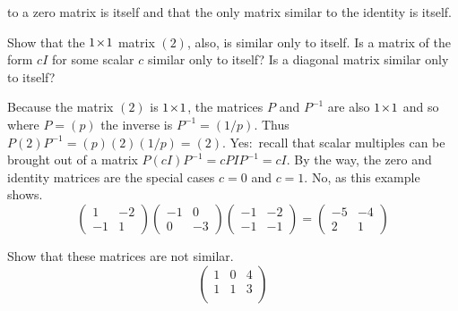 \begin{exercises}
    to a zero matrix is itself and that 
    the only matrix similar to the identity
    is itself.
    \begin{exparts}
      \partsitem Show that the $1 \! \times \! 1$ matrix $(2)$,
         also, is similar only to itself.
      \partsitem Is a matrix of the form $cI$ for some scalar $c$
         similar only to itself?
     \partsitem Is a diagonal matrix similar only to itself?
    \end{exparts}
    \begin{answer}
     \begin{exparts}
      \partsitem Because the matrix $(2)$ is $1 \! \times \! 1$, the matrices
         $P$ and $P^{-1}$ are also $1 \! \times \! 1$ and so where
         $P=(p)$ the inverse is $P^{-1}=(1/p)$.  
         Thus $P(2)P^{-1}=(p)(2)(1/p)=(2)$.
      \partsitem Yes:~recall that scalar multiples can be brought out 
        of a matrix \( P(cI)P^{-1}=cPIP^{-1}=cI \).
        By the way, the zero and identity matrices are the special cases
        $c=0$ and $c=1$.
      \partsitem No, as this example shows.
        \begin{equation*}
           \begin{pmatrix}
              1  &-2  \\
             -1  &1
            \end{pmatrix}
           \begin{pmatrix}
             -1  &0   \\
              0  &-3
           \end{pmatrix}
           \begin{pmatrix}
              -1  &-2   \\
              -1  &-1
           \end{pmatrix}
           =
           \begin{pmatrix}
              -5  &-4   \\
              2   &1
           \end{pmatrix}
        \end{equation*} 
    \end{exparts}  
   \end{answer}
  \item 
    Show that these matrices are not similar.
    \begin{equation*}
       \begin{pmatrix}
          1  &0  &4  \\
          1  &1  &3  \\

\end{pmatrix}
\end{equation*}
\end{exercises}
